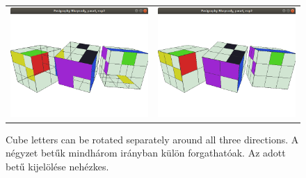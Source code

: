 \documentclass[a4paper]{article}
\begin{document}
\begin{figure}[h]
\begin{tabular}{ll}
\includegraphics[scale=.25, frame]{para6exp2t}
&
\includegraphics[scale=.25, frame]{para6exp2}
\end{tabular}
\caption{Cube letters can be rotated separately around all three directions. A négyzet betűk mindhárom irányban külön forgathatóak. Az adott betű kijelölése nehézkes.}
\label{figpara6}
\end{figure}
\end{document}
